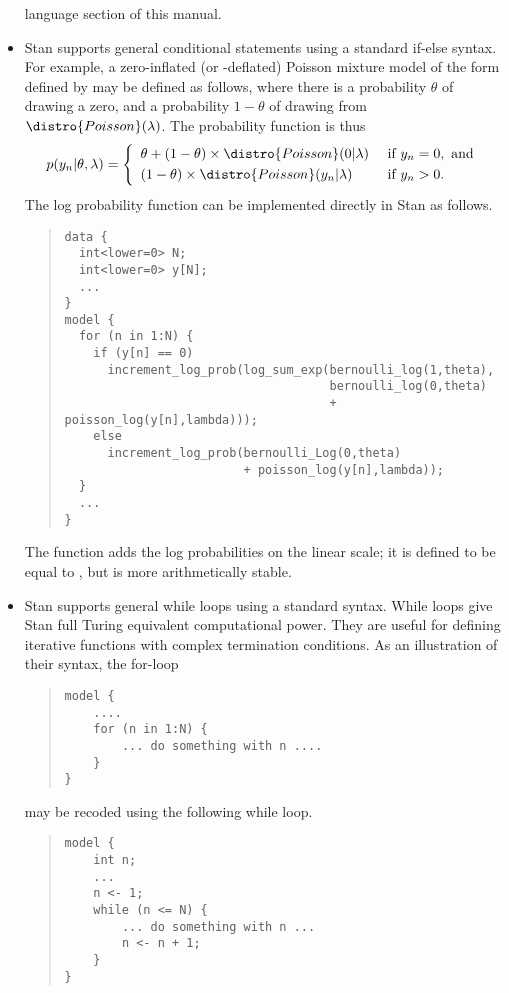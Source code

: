 \begin{itemize}
language section of this manual.
%
\item Stan supports general conditional statements using a standard
  if-else syntax.  For example, a zero-inflated (or -deflated) Poisson
  mixture model of the form defined by \citet{Lambert:1992} 
  may be defined as follows, where there is a probability $\theta$ of
  drawing a zero, and a probability $1 - \theta$ of drawing from
  $\distro{Poisson}(\lambda)$.  The probability function is thus
\[
p(y_n|\theta,\lambda) 
= 
\left\{
\begin{array}{ll}
\theta + (1 - \theta) \times \distro{Poisson}(0|\lambda) & \mbox{ if } y_n = 0, \mbox{ and}
\\[3pt]
(1-\theta) \times \distro{Poisson}(y_n|\lambda) & \mbox{ if } y_n > 0.
\end{array}
\right.
\] 
%
The log probability function can be implemented directly in Stan as follows.
%
\begin{quote}
\begin{Verbatim}[fontsize=\small]
data {
  int<lower=0> N;
  int<lower=0> y[N];
  ...
}
model {
  for (n in 1:N) {
    if (y[n] == 0)
      increment_log_prob(log_sum_exp(bernoulli_log(1,theta),
                                     bernoulli_log(0,theta) 
                                     + poisson_log(y[n],lambda)));
    else
      increment_log_prob(bernoulli_Log(0,theta)
                         + poisson_log(y[n],lambda));
  }
  ...
}
\end{Verbatim}
\end{quote}
%
The  function adds the log probabilities
on the linear scale; it is defined to be equal to , but is more arithmetically stable.
%
\item Stan supports general while loops using a standard syntax.  
While loops give Stan full Turing equivalent computational power.
They are useful for defining iterative functions with complex
termination conditions.  As an illustration of their syntax,
the for-loop
%
\begin{quote}
\begin{Verbatim}[fontsize=\small]
model {
    ....
    for (n in 1:N) {
        ... do something with n ....
    }
}
\end{Verbatim}
\end{quote}
%
may be recoded using the following while loop.
%
\begin{quote}
\begin{Verbatim}[fontsize=\small]
model {
    int n;
    ...
    n <- 1;
    while (n <= N) {
        ... do something with n ...
        n <- n + 1;
    }
}
\end{Verbatim}
\end{quote}
%


\end{itemize}


